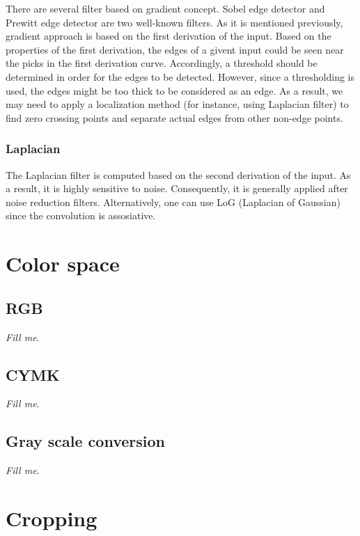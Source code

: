 \documentclass{article}
\begin{document}
			There are several filter based on gradient concept. Sobel edge detector and Prewitt edge detector are two well-known filters.
			As it is mentioned previously, gradient approach is based on the first derivation of the input. Based on the properties of
			the first derivation, the edges of a givent input could be seen near the picks in the first derivation curve. Accordingly, a threshold should be
			determined in order for the edges to be detected. However, since a thresholding is used, the edges might be too thick to be considered
			as an edge. As a result, we may need to apply a localization method (for instance, using Laplacian filter) to find zero
			crossing points and separate actual edges from other non-edge points.
		
		\subsubsection{Laplacian}
			The Laplacian filter is computed based on the second derivation of the input. As a result, it is highly sensitive to noise. Consequently,
			it is generally applied after noise reduction filters. Alternatively, one can use LoG (Laplacian of Gaussian) since the convolution is
			assosiative.
			

\section{Color space}          

	\subsection{RGB}
		
		\textit{Fill me}.

	\subsection{CYMK}

		\textit{Fill me}.

	\subsection{Gray scale conversion}

		\textit{Fill me}.

\section{Cropping}
\end{document}
